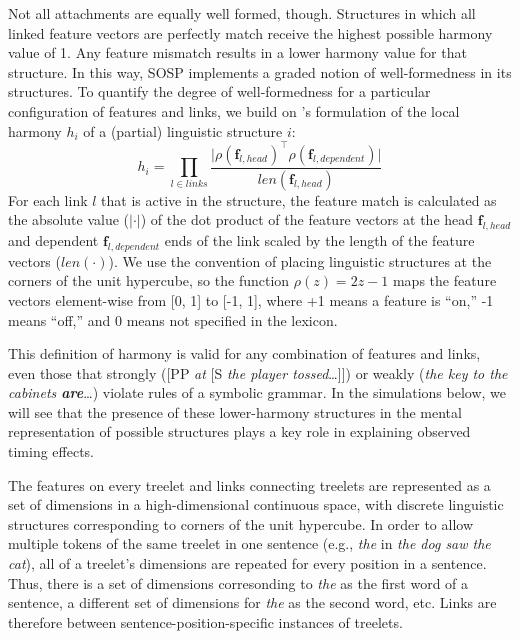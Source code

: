 \documentclass[10pt,letterpaper]{article}
\begin{document}
Not all attachments are equally well formed, though. Structures in which all linked feature vectors are perfectly match receive the highest possible harmony value of 1. Any feature mismatch results in a lower harmony value for that structure. In this way, SOSP implements a graded notion of well-formedness in its structures. To quantify the degree of well-formedness for a particular configuration of features and links, we build on 's formulation of the local harmony $h_i$ of a (partial) linguistic structure $i$:
\begin{equation}\label{local_harmony}
h_i = \prod_{l\in links} \frac{\vert\rho(\mathbf{f}_{l, head})^\intercal \rho(\mathbf{f}_{l, dependent})\vert}{len(\mathbf{f}_{l, head})}
\end{equation}
For each link $l$ that is active in the structure, the feature match is calculated as the absolute value ($\vert\cdot\vert$) of the dot product of the feature vectors at the head $\mathbf{f}_{l, head}$ and dependent $\mathbf{f}_{l, dependent}$ ends of the link scaled by the length of the feature vectors ($len(\cdot)$). We use the convention of placing linguistic structures at the corners of the unit hypercube, so the function $\rho(z) = 2z - 1$ maps the feature vectors element-wise from [0, 1] to [-1, 1], where +1 means a feature is ``on,'' -1 means ``off,'' and 0 means not specified in the lexicon.

This definition of harmony is valid for any combination of features and links, even those that strongly ([PP \emph{at} [S \emph{the player tossed}\dots]]) or weakly (\emph{the key to the cabinets \textbf{are}}\dots) violate rules of a symbolic grammar. In the simulations below, we will see that the presence of these lower-harmony structures in the mental representation of possible structures plays a key role in explaining observed timing effects.

The features on every treelet and links connecting treelets are represented as a set of dimensions in a high-dimensional continuous space, with discrete linguistic structures corresponding to corners of the unit hypercube. In order to allow multiple tokens of the same treelet in one sentence (e.g., \emph{the} in \emph{the dog saw the cat}), all of a treelet's dimensions are repeated for every position in a sentence. Thus, there is a set of dimensions corresonding to \emph{the} as the first word of a sentence, a different set of dimensions for \emph{the} as the second word, etc. Links are therefore between sentence-position-specific instances of treelets.
\end{document}
